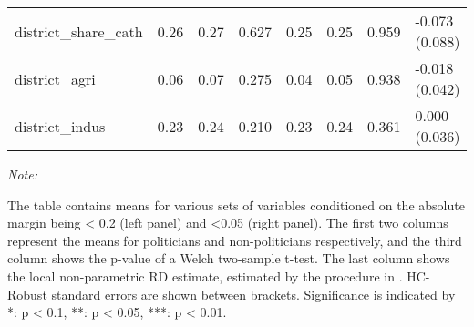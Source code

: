 \begin{table}[!h]
{\begin{threeparttable}
\begin{tabular}[t]{llllllll}
\hspace{1em}district\_share\_cath & \num{0.26} & \num{0.27} & 0.627 & \num{0.25} & \num{0.25} & 0.959 & -0.073 (0.088)\\
\hspace{1em}district\_agri & \num{0.06} & \num{0.07} & 0.275 & \num{0.04} & \num{0.05} & 0.938 & -0.018 (0.042)\\
\hspace{1em}district\_indus & \num{0.23} & \num{0.24} & 0.210 & \num{0.23} & \num{0.24} & 0.361 & 0.000 (0.036)\\
\bottomrule
\end{tabular}
\begin{tablenotes}[para]
\item \textit{Note: } 
\item The table contains means for various sets of variables conditioned on the absolute margin being < 0.2 (left panel) and <0.05 (right panel). The first two columns represent the means for politicians and non-politicians respectively, and the third column shows the p-value of a Welch two-sample t-test. The last column shows the local non-parametric RD estimate, estimated by the procedure in \cite{cattaneo2019practical}. HC-Robust standard errors are shown between brackets. Significance is indicated by *: p < 0.1, **: p < 0.05, ***: p < 0.01.
\end{tablenotes}
\end{threeparttable}}
\end{table}
